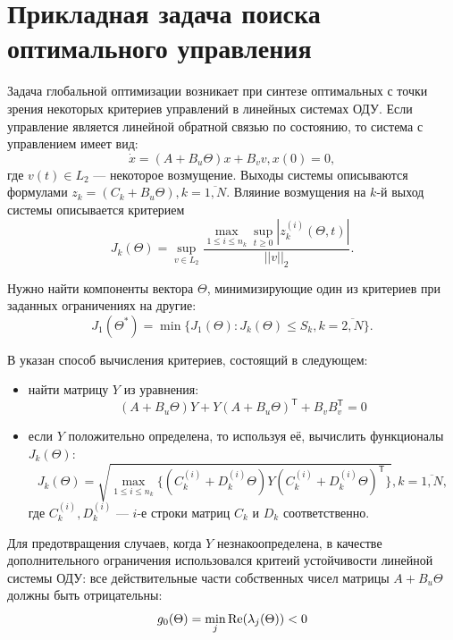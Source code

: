 \section{Прикладная задача поиска оптимального управления}
\label{sec:optimal_cpntrol}
Задача глобальной оптимизации возникает при синтезе оптимальных с точки зрения некоторых
критериев управлений в линейных системах ОДУ. Если управление является линейной обратной
связью по состоянию, то система с управлением имеет вид:
\begin{equation}
  \label{eq:control_system}
    \dot x = (A+B_u\Theta)x + B_v v, x(0)=0,
\end{equation}
где  \(v(t)\in L_2\) --- некоторое возмущение.
Выходы системы описываются формулами \(z_k=(C_k+B_u\Theta),k=\overline{1,N}\).
Вляиние возмущения на \(k\)-й выход системы описывается критерием
\begin{displaymath}
  J_k(\Theta)=\sup_{v\in L_2} \frac{\max_{1\le i \le n_k} \sup_{t\ge 0}|z_k^{(i)}(\Theta,t)|}{||v||_2}.
\end{displaymath}

Нужно найти компоненты вектора \(\Theta\), минимизирующие один из критериев при
заданных ограничениях на другие:
\begin{displaymath}
   J_1(\Theta^*)=\min\{J_1(\Theta):J_k(\Theta)\leqslant S_k,k=\overline{2,N}\}.
\end{displaymath}

В \cite{optControl} указан способ вычисления критериев, состоящий в следующем:
\begin{itemize}
\item найти матрицу \(Y\) из уравнения:
\begin{displaymath}
  (A+B_u\Theta)Y+Y(A+B_u\Theta)^\mathsf{T}+B_v B_v^\mathsf{T} = 0
\end{displaymath}
\item если \(Y\) положительно определена, то используя её, вычислить функционалы \(J_k(\Theta)\):
\begin{displaymath}
  J_k(\Theta)=\sqrt{\max_{1\leqslant i\leqslant n_k}\{(C_k^{(i)}+D_k^{(i)}\Theta)Y(C_k^{(i)}+D_k^{(i)}\Theta)^\mathsf{T}\}},k=\overline{1,N},
\end{displaymath}
где \(C_k^{(i)},D_k^{(i)}\) --- \(i\)-е строки матриц \(C_k\) и \(D_k\) соответственно.
\end{itemize}

Для предотвращения случаев, когда \(Y\) незнакоопределена, в качестве дополнительного ограничения
использовался критеий устойчивости линейной системы ОДУ: все действительные части
собственных чисел матрицы \(A+B_u\Theta\) должны быть отрицательны:
\begin{displaymath}
  g_0(\Theta)=\min_{j}\operatorname{\operatorname{Re}}(\lambda_j(\Theta)) < 0
\end{displaymath}

